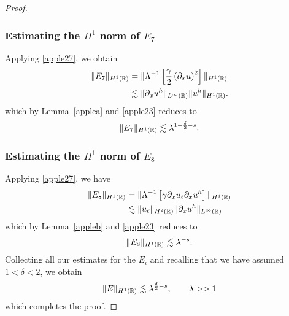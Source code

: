 \begin{proof}
\subsubsection{Estimating the $H^1$ norm of $\hyperref[all_errors_together]{E_7}$} Applying \eqref{apple27}, we obtain
\begin{equation}
	\begin{split}
		\|E_7\|_{H^1(\mathbb{R})} 
		& = \|\Lambda^{-1} \left[ \frac{\gamma}{2}\left( \partial_x u \right)^2
		\right]\|_{H^1(\mathbb{R})}
		\\
		& \lesssim  \|\partial_x u^h\|_{L^\infty(\mathbb{R})} \|u^h\|_{H^1(\mathbb{R})}.
		\label{apple32}
	\end{split}
\end{equation}
which by Lemma~\ref{applea} and \eqref{apple23} reduces to
\begin{equation}
	\begin{split}
		\|E_7\|_{H^1(\mathbb{R})} \lesssim \lambda^{1-\frac{\delta}{2}-s}.
		\label{apple33'}
	\end{split}
\end{equation}
%
%
%
%
%
\subsubsection{Estimating the $H^1$ norm of $\hyperref[all_errors_together]{E_8}$} Applying \eqref{apple27}, we have
\begin{equation}
	\begin{split}
		\|E_8\|_{H^1(\mathbb{R})}
		& = \|\Lambda^{-1}\left[ \gamma \partial_x u_\ell \partial_x u^h \right]\|_{H^1(\mathbb{R})}
		\\
		& \lesssim \|u_\ell\|_{H^2(\mathbb{R})} \|\partial_x u^h\|_{L^\infty(\mathbb{R})}
		\label{apple33}
	\end{split}
\end{equation}
which by Lemma~\ref{appleb} and \eqref{apple23} reduces to
\begin{equation}
	\begin{split}
		\|E_8\|_{H^1(\mathbb{R})} \lesssim \lambda^{-s}.
		\label{apple34}
	\end{split}
\end{equation}
Collecting all our estimates for the $E_i$ and recalling that we have assumed
$1<\delta<2$, we obtain
\begin{equation*}
	\begin{split}
		\|E\|_{H^1(\mathbb{R})}
		 \lesssim \lambda^{\frac{\delta}{2} -s }, \qquad \lambda >>1
	\end{split}
\end{equation*}
which completes the proof.
\end{proof}
%
%
%
%
%
